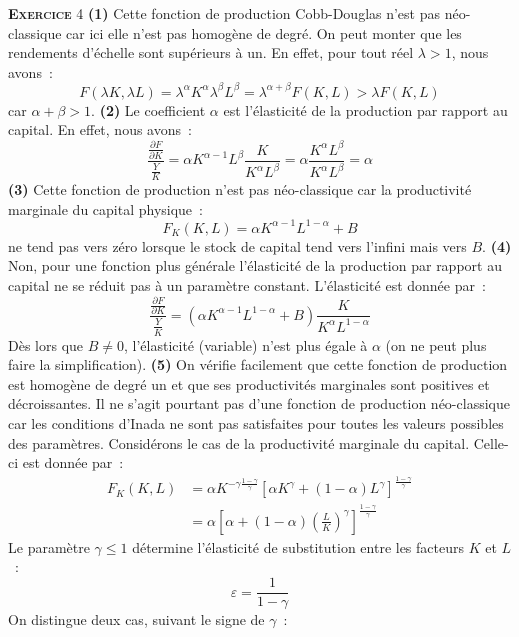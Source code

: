 \documentclass[10pt,a4paper,notitlepage]{report}
\newcommand{\exercice}[1]{\textsc{\textbf{Exercice}} #1}
\newcommand{\question}[1]{\textbf{(#1)}}
\begin{document}
\exercice{4}  \question{1} Cette  fonction de  production Cobb-Douglas
n'est pas néo-classique  car ici elle n'est pas homogène  de degré. On
peut monter  que les  rendements d'échelle sont  supérieurs à  un. En
effet, pour tout réel $\lambda>1$, nous avons :
\[
F(\lambda K, \lambda L) = \lambda^{\alpha}K^{\alpha}\lambda^{\beta}L^{\beta} = \lambda^{\alpha+\beta}F(K,L)>\lambda F(K,L)
\]
car  $\alpha+\beta>1$.   \question{2}  Le  coefficient   $\alpha$  est
l'élasticité de la  production par rapport au capital.  En effet, nous
avons :
\[
\frac{\frac{\partial F}{\partial K}}{\frac{Y}{K}} = \alpha K^{\alpha-1}L^{\beta}\frac{K}{K^{\alpha}L^{\beta}} = \alpha\frac{K^{\alpha}L^{\beta}}{K^{\alpha}L^{\beta}} = \alpha
\]
\question{3} Cette fonction de  production n'est pas néo-classique car
la productivité marginale du capital physique :
\[
F_K(K,L) = \alpha K^{\alpha-1}L^{1-\alpha} + B
\]  
ne tend pas  vers zéro lorsque le stock de  capital tend vers l'infini
mais  vers $B$.  \question{4}  Non, pour  une  fonction plus  générale
l'élasticité de la production par rapport  au capital ne se réduit pas
à un paramètre constant. L'élasticité est donnée par :
\[
\frac{\frac{\partial F}{\partial K}}{\frac{Y}{K}} = \left(\alpha K^{\alpha-1}L^{1-\alpha}+B\right)\frac{K}{K^{\alpha}L^{1-\alpha}}
\]
Dès lors  que $B\neq  0$, l'élasticité (variable)  n'est plus  égale à
$\alpha$ (on ne  peut plus faire la  simplification).  \question{5} On
vérifie facilement  que cette fonction  de production est  homogène de
degré  un  et  que  ses productivités  marginales  sont  positives  et
décroissantes. Il ne s'agit pourtant  pas d'une fonction de production
néo-classique car les conditions d'Inada  ne sont pas satisfaites pour
toutes les valeurs possibles des  paramètres. Considérons le cas de la
productivité marginale du capital. Celle-ci est donnée par :
\[
\begin{split}
F_K(K,L) &= \alpha K^{-\gamma\frac{1-\gamma}{\gamma}}\left[\alpha K^{\gamma} + (1-\alpha)L^{\gamma}\right]^{\frac{1-\gamma}{\gamma}}\\
&= \alpha \left[\alpha + (1-\alpha)\left(\frac{L}{K}\right)^{\gamma}\right]^{\frac{1-\gamma}{\gamma}}
\end{split}
\]
Le paramètre $\gamma\leq 1$ détermine l'élasticité de substitution entre les facteurs $K$ et $L$ : 
\[
\varepsilon = \frac{1}{1-\gamma} 
\]
On distingue deux cas, suivant le signe de $\gamma$ :
\end{document}
